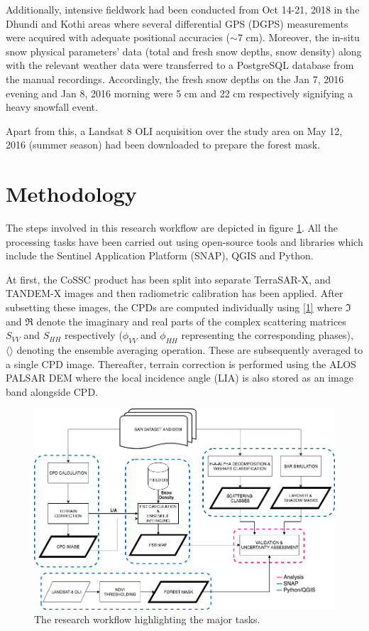 \documentclass{article}
\begin{document}
Additionally, intensive fieldwork had been conducted from Oct 14-21, 2018 in the Dhundi and Kothi areas where several differential GPS (DGPS) measurements were acquired with adequate positional accuracies ($\sim$7 cm). Moreover, the in-situ snow physical parameters’ data (total and fresh snow depths, snow density) along with the relevant weather data were transferred to a PostgreSQL database from the manual recordings. Accordingly, the fresh snow depths on the Jan 7, 2016 evening and Jan 8, 2016 morning were 5 cm and 22 cm respectively signifying a heavy snowfall event.

Apart from this, a Landsat 8 OLI acquisition over the study area on May 12, 2016 (summer season) had been downloaded to prepare the forest mask.    


\vspace{-1ex}
\section{Methodology}
\label{sec:method}
The steps involved in this research workflow are depicted in figure \ref{fig:work}. All the processing tasks have been carried out using open-source tools and libraries which include the Sentinel Application Platform (SNAP), QGIS and Python.

At first, the CoSSC product has been split into separate TerraSAR-X, and TANDEM-X images and then radiometric calibration has been applied. After subsetting these images, the CPDs are computed individually using \eqref{1} where $\Im$ and $\Re$ denote the imaginary and real parts of the complex scattering matrices $S_{VV}$ and $S_{HH}$ respectively ($\phi_{VV}$ and $\phi_{HH}$ representing the corresponding phases), $\langle\rangle$ denoting the ensemble averaging operation. These are subsequently averaged to a single CPD image. Thereafter, terrain correction is performed using the ALOS PALSAR DEM where the local incidence angle (LIA) is also stored as an image band alongside CPD.
\begin{figure}[htb]
\centering
\includegraphics[scale=0.248]{Method_FSD.png}
\caption{The research workflow highlighting the major tasks.}
\label{fig:work}
\end{figure}
\end{document}
